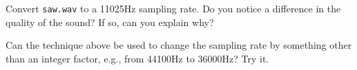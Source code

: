 \begin{problem} %
Convert \texttt{saw.wav} to a 11025Hz sampling rate. Do you notice a difference in the quality of the sound? If so, can you explain why?
\end{problem}

\begin{problem} %
Can the technique above be used to change the sampling rate by something other than an integer factor, e.g., from 44100Hz to 36000Hz? Try it.
\end{problem}

\let\undefined\x
\let\undefined\q
\let\undefined\p
\let\undefined\v
